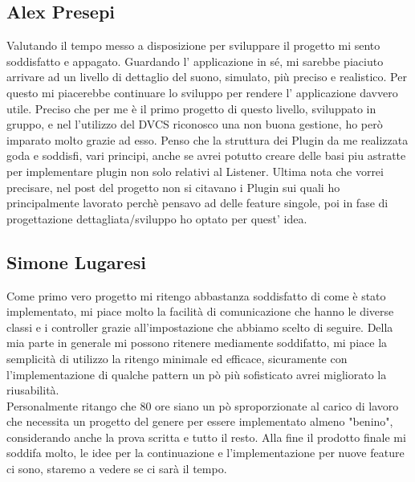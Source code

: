 \documentclass[a4paper,12pt]{report}
\begin{document}
\subsection*{Alex Presepi}
Valutando il tempo messo a disposizione per sviluppare il progetto mi sento soddisfatto e appagato. Guardando l' applicazione in sé, mi sarebbe piaciuto arrivare ad un livello di dettaglio del suono, simulato, più preciso e realistico. Per questo mi piacerebbe continuare lo sviluppo per rendere l' applicazione davvero utile. Preciso che per me è il primo progetto di questo livello, sviluppato in gruppo, e nel l'utilizzo del DVCS riconosco una non buona gestione,  ho però imparato molto grazie ad esso. Penso che la struttura dei Plugin da me realizzata goda e soddisfi, vari principi, anche se avrei potutto creare delle basi piu astratte per implementare plugin non solo relativi al Listener. Ultima nota che vorrei precisare, nel post del progetto non si citavano i Plugin sui quali ho principalmente lavorato perchè pensavo ad delle feature singole, poi in fase di progettazione dettagliata/sviluppo ho optato per quest' idea.
\subsection*{Simone Lugaresi}
Come primo vero progetto mi ritengo abbastanza soddisfatto di come è stato implementato, mi piace molto la facilità di comunicazione che hanno le diverse classi e i controller grazie all'impostazione che abbiamo scelto di seguire. Della mia parte in generale mi possono ritenere mediamente soddifatto, mi piace la semplicità di utilizzo la ritengo minimale ed efficace, sicuramente con l'implementazione di qualche pattern un pò più sofisticato avrei migliorato la riusabilità.\\ Personalmente ritango che 80 ore siano un pò sproporzionate al carico di lavoro che necessita un progetto del genere per essere implementato almeno "benino", considerando anche la prova scritta e tutto il resto. Alla fine il prodotto finale mi soddifa molto, le idee per la continuazione e l'implementazione per nuove feature ci sono, staremo a vedere se ci sarà il tempo.

\appendix
\end{document}
